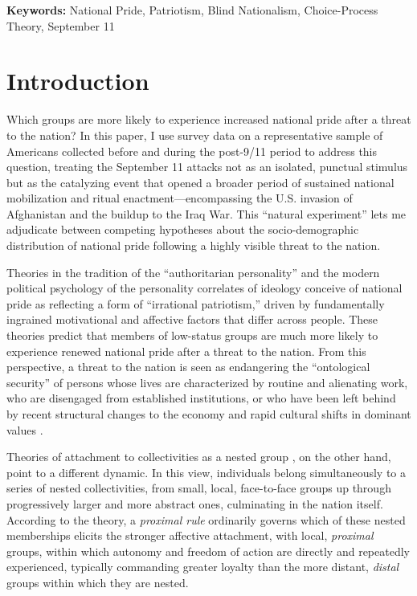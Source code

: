 \documentclass[12pt,letterpaper]{article}
\begin{document}
\vspace{1em}
\noindent\textbf{Keywords:} National Pride, Patriotism, Blind Nationalism, Choice-Process Theory, September 11

\newpage
\section{Introduction}

Which groups are more likely to experience increased national pride after a threat to the nation? In this paper, I use survey data on a representative sample of Americans collected before and during the post-9/11 period to address this question, treating the September 11 attacks not as an isolated, punctual stimulus but as the catalyzing event that opened a broader period of sustained national mobilization and ritual enactment---encompassing the U.S. invasion of Afghanistan and the buildup to the Iraq War. This ``natural experiment'' lets me adjudicate between competing hypotheses about the socio-demographic distribution of national pride following a highly visible threat to the nation.

Theories in the tradition of the ``authoritarian personality'' \citep{adorno1950authoritarian-a52} and the modern political psychology of the personality correlates of ideology \citep{jost2007are-871, jost2017ideology-f69, jost2008ideology-368} conceive of national pride as reflecting a form of ``irrational patriotism,'' driven by fundamentally ingrained motivational and affective factors that differ across people. These theories predict that members of low-status groups are much more likely to experience renewed national pride after a threat to the nation. From this perspective, a threat to the nation is seen as endangering the ``ontological security'' \citep{giddens1984constitution} of persons whose lives are characterized by routine and alienating work, who are disengaged from established institutions, or who have been left behind by recent structural changes to the economy and rapid cultural shifts in dominant values \citep{wuthnow2019left-c34}.

Theories of attachment to collectivities as a nested group \citep{lawler1992affective-8c8, mueller1999commitment}, on the other hand, point to a different dynamic. In this view, individuals belong simultaneously to a series of nested collectivities, from small, local, face-to-face groups up through progressively larger and more abstract ones, culminating in the nation itself. According to the theory, a \textit{proximal rule} ordinarily governs which of these nested memberships elicits the stronger affective attachment, with local, \textit{proximal} groups, within which autonomy and freedom of action are directly and repeatedly experienced, typically commanding greater loyalty than the more distant, \textit{distal} groups within which they are nested. 
\end{document}
